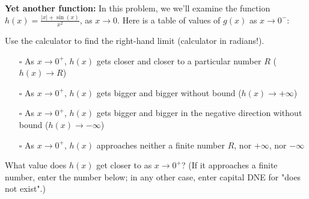 \documentclass[pdftex, brazil, 12pt, twoside]{article}
\begin{document}
\begin{exercise}
  \textbf{Yet another function:} In this problem, we we'll examine the function
  $\displaystyle h(x) = \frac{|x| + \sin{(x)}}{x^2}$, as $x \to 0$.
  Here is a table of values of $g(x)$ as $x \to 0^{-}$:
  \begin{figure}[H]
  \begin{center}
  \end{center}
  \end{figure}
  Use the calculator to find the right-hand limit (calculator in radians!).
  \begin{itemize}[noitemsep]
  \item[$\square$] As $x \to 0^{+}$, $h(x)$ gets closer and closer to a particular number $R$
    ($h(x) \to R$)
  \item[$\square$] As $x \to 0^{+}$, $h(x)$ gets bigger and bigger without bound
    ($h(x) \to +\infty$)
\item[$\square$] As $x \to 0^{+}$, $h(x)$ gets bigger and bigger in the negative direction without bound
    ($h(x) \to -\infty$)  
\item[$\square$] As $x \to 0^{+}$, $h(x)$ approaches neither a finite number $R$, nor $+\infty$,
  nor $-\infty$
  \end{itemize}
\end{exercise}

\begin{exercise}
  What value does $h(x)$ get closer to as $x \to 0^{+}$? (If it approaches a finite
  number, enter the number below; in any other case, enter capital DNE for "does not exist".)
\end{exercise}
\end{document}
